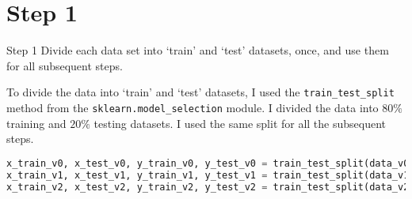 \section*{Step 1}

\begin{custombox}[label={box:Q1}]{Step 1}
	Divide each data set into ‘train’ and ‘test’ datasets, once, and use them for all subsequent steps.
\end{custombox}

\vspace{10mm}

To divide the data into `train' and `test' datasets, I used the \texttt{train\_test\_split} method from the \texttt{sklearn.model\_selection} module. I divided the data into $80\%$ training and $20\%$ testing datasets. I used the same split for all the subsequent steps.

\begin{lstlisting}[language=Python, caption=Dividing the Data into Train and Test Datasets]
x_train_v0, x_test_v0, y_train_v0, y_test_v0 = train_test_split(data_v0[['x1','x2']], data_v0['y'], test_size=0.2, random_state=42)
x_train_v1, x_test_v1, y_train_v1, y_test_v1 = train_test_split(data_v1[['x1','x2']], data_v1['y'], test_size=0.2, random_state=42)
x_train_v2, x_test_v2, y_train_v2, y_test_v2 = train_test_split(data_v2[['x1','x2']], data_v2['y'], test_size=0.2, random_state=42)
\end{lstlisting}